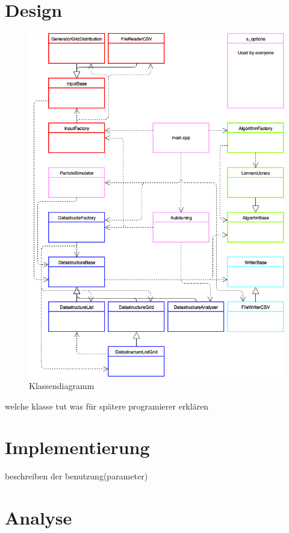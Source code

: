 \documentclass[
	12pt,
	a4paper,
	BCOR10mm,
	DIV14,
	headsepline,
]{scrreprt}
\begin{document}
\section{Design}
\begin{figure}[h]
	\centering
	\includegraphics[height=0.6\textheight]{ClassDiagram.png}
	\caption{Klassendiagramm}
	\label{figure:Klassendiagramm}
\end{figure}
welche klasse tut was
für spätere programierer erklären

\section{Implementierung}

beschreiben der benutzung(parameter)

\section{Analyse}
\end{document}
